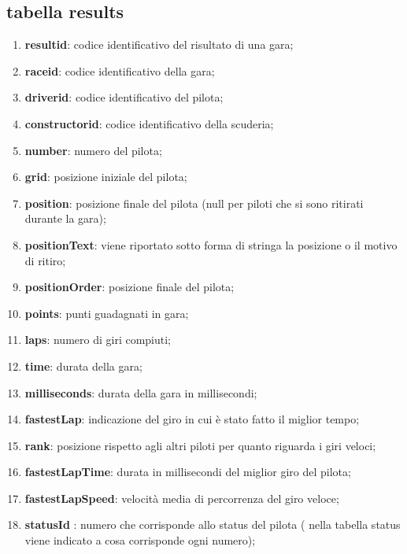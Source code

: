 \subsection{tabella results}%
\begin{enumerate}
    \item \textbf{resultid}: codice identificativo del risultato di una gara;
    \item \textbf{raceid}: codice identificativo della gara;
    \item \textbf{driverid}: codice identificativo del pilota;
    \item \textbf{constructorid}: codice identificativo della scuderia;
    \item \textbf{number}: numero del pilota;
    \item \textbf{grid}: posizione iniziale del pilota;
    \item \textbf{position}: posizione finale del pilota (null per piloti che si sono ritirati durante la gara);
    \item \textbf{positionText}: viene riportato sotto forma di stringa la posizione o il motivo di ritiro;
    \item \textbf{positionOrder}: posizione finale del pilota;
    \item \textbf{points}: punti guadagnati in gara;
    \item \textbf{laps}: numero di giri compiuti;
    \item \textbf{time}: durata della gara;
    \item \textbf{milliseconds}: durata della gara in millisecondi;
    \item \textbf{fastestLap}: indicazione del giro in cui è stato fatto il miglior tempo;
    \item \textbf{rank}: posizione rispetto agli altri piloti per quanto riguarda i giri veloci;
    \item \textbf{fastestLapTime}: durata in millisecondi del miglior giro del pilota;
    \item \textbf{fastestLapSpeed}: velocità media di percorrenza del giro veloce;
    \item \textbf{statusId} : numero che corrisponde allo status del pilota ( nella tabella status viene indicato a cosa corrisponde ogni numero);
\end{enumerate}
